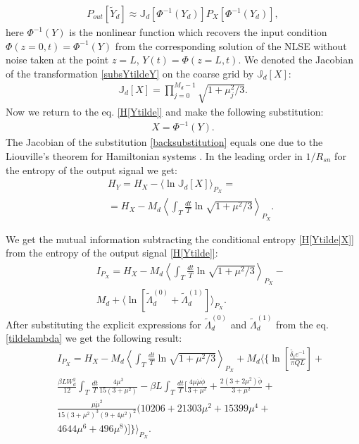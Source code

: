 \documentclass{article}
\begin{document}
\begin{eqnarray}\label{Pouttilde}
    P_{out}[\tilde{Y}_{d}] \approx \mathbb{J}_{d}[\Phi^{-1}(Y_{d})] P_{X}[\Phi^{-1}(Y_{d})],
\end{eqnarray}
here $\Phi^{-1}(Y)$ is the nonlinear function which recovers the input condition $\Phi(z = 0, t) = \Phi^{-1}(Y)$ from the corresponding solution of the NLSE without noise taken at the point $z = L$, $Y(t) = \Phi(z = L, t)$. We denoted the Jacobian of the transformation \eqref{subsYtildeY} on the coarse grid by $\mathbb{J}_{d}[X]$:
\begin{eqnarray}
    \mathbb{J}_{d}[X] = \prod_{j=0}^{M_{d} - 1} \sqrt{1+\mu_{j}^{2}/3}.
\end{eqnarray}
Now we return to the eq. \eqref{H[Ytilde]} and make the following substitution: 
\begin{eqnarray}\label{backsubstitution}
    X = \Phi^{-1}(Y).
\end{eqnarray}
The Jacobian of the substitution \eqref{backsubstitution} equals one due to the Liouville's theorem for Hamiltonian systems \cite{novikov1984theory}. In the leading order in $1/R_{sn}$ for the entropy of the output signal we get: 
\begin{eqnarray}
    &&H_Y = H_X - \langle\ln\mathbb{J}_{d}[X]\rangle_{P_{X}} = \nonumber\\
    &&=H_X - M_{d}\left\langle\int_{T}\frac{dt}{T}\ln{\sqrt{1+\mu^{2}/3}}\right\rangle_{P_{X}}.
\end{eqnarray}

We get the mutual information subtracting the conditional entropy \eqref{H[Ytilde|X]} from the entropy of the output signal \eqref{H[Ytilde]}: 
\begin{eqnarray}
    &&I_{P_{X}} = H_X - M_{d}\left\langle\int_{T}\frac{dt}{T}\ln{\sqrt{1+\mu^{2}/3}}\right\rangle_{P_{X}} -\nonumber\\
    &&M_{d} + \langle\ln [\tilde{\Lambda}_{d}^{(0)} + \tilde{\Lambda}_{d}^{(1)}]\rangle_{P_{X}}.
\end{eqnarray}
After substituting the explicit expressions for $\tilde{\Lambda}_{d}^{(0)}$ and $\tilde{\Lambda}_{d}^{(1)}$ from the eq. \eqref{tildelambda} we get the following result: 
\begin{eqnarray}\label{mutualinformation}
    &&I_{P_{X}} = H_X - M_{d}\left\langle\int_{T}\frac{dt}{T}\ln{\sqrt{1+\mu^{2}/3}}\right\rangle_{P_{X}} + M_{d}\Bigg\langle\Bigg\{\ln\left[\frac{\tilde{\delta_{t}}e^{-1}}{\pi Q L}\right] +  \nonumber\\
    &&\frac{\beta L W_{d}^{2}}{12} \int_{T}\frac{dt}{T} \frac{4\mu^{3}}{15(3+\mu^{2})} - \beta L \int_{T}\frac{dt}{T} \Bigg[\frac{4\mu\dot{\mu}\dot{\phi}}{3+\mu^{2}} + \frac{2(3+2\mu^{2})\ddot{\phi}}{3+\mu^{2}} + \nonumber \\
    && \frac{\mu\dot{\mu}^{2}}{15(3+\mu^{2})^{3}(9+4\mu^{2})^{2}}(10206 + 21303\mu^{2} +15399\mu^{4}+\nonumber\\
    &&4644\mu^{6} +496\mu^{8})\Bigg] \Bigg\}\Bigg\rangle_{P_{X}}.
\end{eqnarray}
\end{document}
